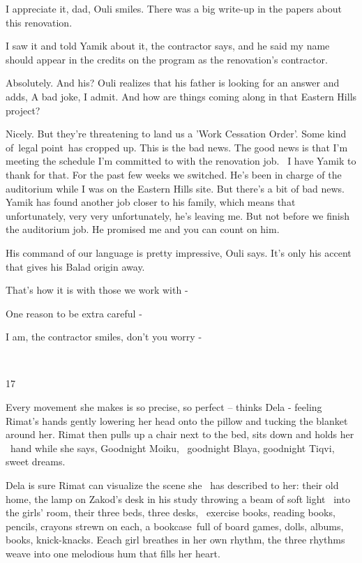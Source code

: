 \documentclass[12pt]{book}
\begin{document}
{\textquotedbl}I appreciate it, dad,{\textquotedbl} Ouli smiles. {\textquotedbl}There was a big write-up in the papers
about this renovation.{\textquotedbl}

{\textquotedbl}I saw it and told Yamik about it,{\textquotedbl} the contractor says, {\textquotedbl}and he said my name
should appear in the credits on the program as the renovation's contractor.{\textquotedbl}

{\textquotedbl}Absolutely. And his?{\textquotedbl} Ouli realizes that his father is looking for an answer and adds,
{\textquotedbl}A bad joke, I admit. And how are things coming along in that Eastern Hills project?{\textquotedbl}

{\textquotedbl}Nicely. But they're threatening to land us a 'Work Cessation Order'. Some kind of~legal point~has cropped
up. This is the bad news. The good news is that I'm meeting the schedule I'm committed to with the renovation job. \ I
have Yamik to thank for that. For the past few weeks we switched. He's been in charge of the auditorium while I was on
the Eastern Hills site. But there's a bit of bad news. Yamik has found another job closer to his family, which means
that unfortunately, very very unfortunately, he's leaving me. But not before we finish the auditorium job. He promised
me and you can count on him.{\textquotedbl}

{\textquotedbl}His command of our language is pretty impressive,{\textquotedbl} Ouli says. {\textquotedbl}It's only his
accent that gives his Balad origin away.{\textquotedbl}

{\textquotedbl}That's how it is with those we work with -{\textquotedbl}

{\textquotedbl}One reason to be extra careful -{\textquotedbl}

{\textquotedbl}I am,{\textquotedbl} the contractor smiles, {\textquotedbl}don't you worry -{\textquotedbl}

~

17

Every movement she makes is so precise, so perfect -- thinks Dela - feeling Rimat's hands gently lowering her head onto
the pillow and tucking the blanket around her. Rimat then pulls up a chair next to the bed, sits down and holds her
\ hand while she says, {\textquotedbl}Goodnight Moiku, ~goodnight Blaya, goodnight Tiqvi, sweet dreams.{\textquotedbl}

Dela is sure Rimat can visualize the scene she \ has described to her: their old home, the lamp on Zakod's desk in his
study throwing a beam of soft light \ into the girls' room, their three beds, three desks, \ exercise books, reading
books, pencils, crayons strewn on each, a bookcase~full of board games, dolls, albums, books, knick-knacks. Eeach girl
breathes in her own rhythm, the three rhythms weave into one melodious hum that fills her heart.
\end{document}

